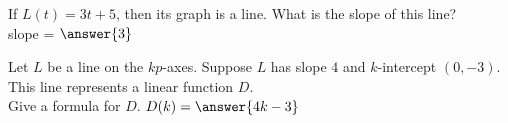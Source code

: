 \documentclass{ximera}
\begin{document}
\begin{exercise}

If $L(t) = 3t + 5$, then its graph is a line. What is the slope of this line? \\
slope = $\answer{3}$

\end{exercise}




\begin{exercise}

Let $L$ be a line on the $kp$-axes.  Suppose $L$ has slope $4$ and $k$-intercept $(0, -3)$.  \\
This line represents a linear function $D$.  \\
Give a formula for $D$.
$D(k) = \answer{4k - 3}$ 

\end{exercise}
\end{document}
